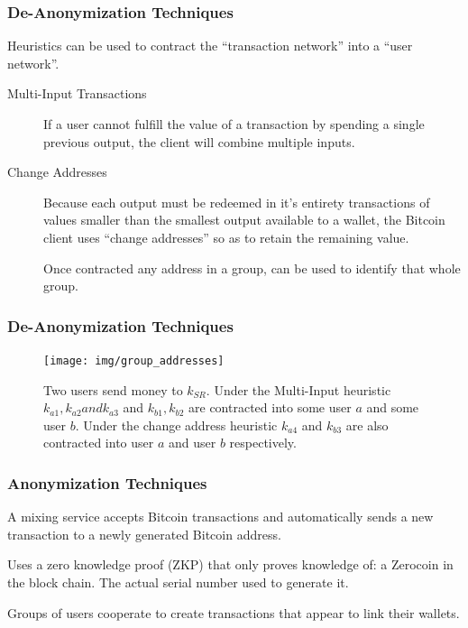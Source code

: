 \documentclass{beamer}
\begin{document}
\begin{frame}
\frametitle{De-Anonymization Techniques}
Heuristics can be used to contract the ``transaction network'' into a ``user network''.
\begin{description}
\item[Multi-Input Transactions] If a user cannot fulfill the value of a transaction by spending a  single previous output, the client will combine multiple inputs\cite{reid-anon}.
\item[Change Addresses] Because each output must be redeemed in it's entirety transactions of values smaller than the smallest output available to a wallet, the Bitcoin client uses ``change addresses'' so as to retain the remaining value.

Once contracted any address in a group, can be used to identify that whole group.
\end{description}
\end{frame}

\begin{frame}
\frametitle{De-Anonymization Techniques}
\begin{figure}[h!]
    \centering
    \texttt{[image: img/group\_addresses]}
    \caption{Two users send money to $k_{SR}$. Under the Multi-Input  heuristic $k_{a1}, k_{a2} and k_{a3}$ and $k_{b1}, k_{b2}$ are contracted into  some user $a$ and some user $b$. Under the change address heuristic  $k_{a4}$ and $k_{b3}$ are also contracted into user $a$ and user $b$  respectively. }
    \label{fig:blockchain}
\end{figure}
\end{frame}


\begin{frame}
\frametitle{Anonymization Techniques}
\begin{description}
\item[Fully Trusted Mixing]
A mixing service accepts Bitcoin transactions and automatically sends a new transaction to a newly generated Bitcoin address.
\item[ZeroCoin]
Uses a zero knowledge proof (ZKP) that only proves knowledge of: a Zerocoin in the block chain. The actual serial number used to generate it\cite{zerocoin}.
\item[In-Protocol Mixing]
Groups of users cooperate to create transactions that appear to link their wallets.

\end{description}
\end{frame}
\end{document}

